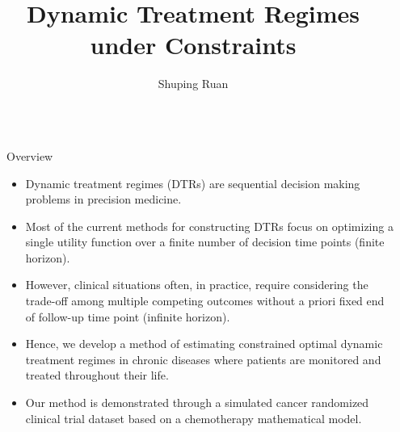 \documentclass[final,hyperref={pdfpagelabels=false}]{beamer}
\title{\huge Dynamic Treatment Regimes under Constraints} %
\author{Shuping Ruan} %
\institute{Department of Statistics, North Carolina State University} %
\begin{document}

\begin{frame}[t] %

\begin{columns}[t] %

\begin{column}{.02\textwidth}\end{column} %

\begin{column}{.465\textwidth} %


\begin{block}{Overview}
	\begin{itemize}
		\item Dynamic treatment regimes (DTRs) are sequential decision making problems in precision medicine.
		\item Most of the current methods for constructing DTRs focus on optimizing a single utility function over a finite number of decision time points (finite horizon).
		\item However, clinical situations often, in practice, require considering the trade-off among multiple competing outcomes without a priori fixed end of follow-up time point (infinite horizon). 
		\item  Hence, we develop a method of estimating constrained optimal dynamic treatment regimes in chronic diseases where patients are monitored and treated throughout their life. 
		\item  Our method is demonstrated through a simulated cancer randomized clinical trial dataset based on a chemotherapy mathematical model.
	\end{itemize}
\end{block}

            

\end{column}
\end{columns}
\end{frame}
\end{document}
